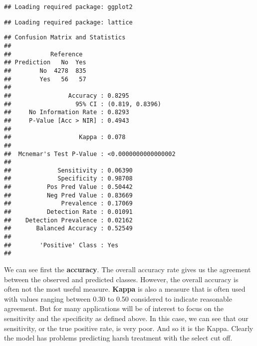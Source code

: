 \documentclass[
]{book}
\newenvironment{Shaded}{\begin{snugshade}}{\end{snugshade}}
\newcommand{\AttributeTok}[1]{\textcolor[rgb]{0.13,0.29,0.53}{#1}}
\newcommand{\CommentTok}[1]{\textcolor[rgb]{0.56,0.35,0.01}{\textit{#1}}}
\newcommand{\FunctionTok}[1]{\textcolor[rgb]{0.13,0.29,0.53}{\textbf{#1}}}
\newcommand{\NormalTok}[1]{#1}
\newcommand{\SpecialCharTok}[1]{\textcolor[rgb]{0.81,0.36,0.00}{\textbf{#1}}}
\newcommand{\StringTok}[1]{\textcolor[rgb]{0.31,0.60,0.02}{#1}}
\begin{document}
\begin{verbatim}
## Loading required package: ggplot2
\end{verbatim}

\begin{verbatim}
## Loading required package: lattice
\end{verbatim}

\begin{Shaded}
\end{Shaded}

\begin{verbatim}
## Confusion Matrix and Statistics
## 
##           Reference
## Prediction   No  Yes
##        No  4278  835
##        Yes   56   57
##                                              
##                Accuracy : 0.8295             
##                  95% CI : (0.819, 0.8396)    
##     No Information Rate : 0.8293             
##     P-Value [Acc > NIR] : 0.4943             
##                                              
##                   Kappa : 0.078              
##                                              
##  Mcnemar's Test P-Value : <0.0000000000000002
##                                              
##             Sensitivity : 0.06390            
##             Specificity : 0.98708            
##          Pos Pred Value : 0.50442            
##          Neg Pred Value : 0.83669            
##              Prevalence : 0.17069            
##          Detection Rate : 0.01091            
##    Detection Prevalence : 0.02162            
##       Balanced Accuracy : 0.52549            
##                                              
##        'Positive' Class : Yes                
## 
\end{verbatim}

We can see first the \textbf{accuracy}. The overall accuracy rate gives us the agreement between the observed and predicted classes. However, the overall accuracy is often not the most useful measure. \textbf{Kappa} is also a measure that is often used with values ranging between 0.30 to 0.50 considered to indicate reasonable agreement. But for many applications will be of interest to focus on the sensitivity and the specificity as defined above. In this case, we can see that our sensitivity, or the true positive rate, is very poor. And so it is the Kappa. Clearly the model has problems predicting harsh treatment with the select cut off.
\end{document}
